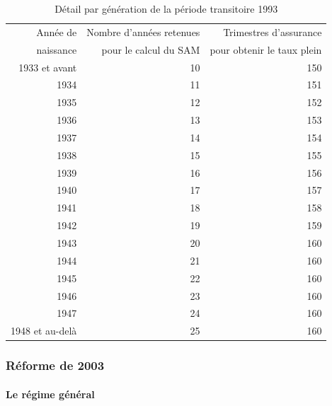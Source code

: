 \begin{table}[h]
  \centering
  \caption{Détail par génération de la période transitoire 1993}
    \begin{tabular}{rrr}
    \toprule
    Année de  & Nombre d'années retenues & Trimestres d'assurance  \\
    naissance & pour le calcul du SAM    & pour obtenir le taux plein \\
    \midrule
    1933 et avant & 10    & 150 \\
    1934  & 11    & 151 \\
    1935  & 12    & 152 \\
    1936  & 13    & 153 \\
    1937  & 14    & 154 \\
    1938  & 15    & 155 \\
    1939  & 16    & 156 \\
    1940  & 17    & 157 \\
    1941  & 18    & 158 \\
    1942  & 19    & 159 \\
    1943  & 20    & 160 \\
    1944  & 21    & 160 \\
    1945  & 22    & 160 \\
    1946  & 23    & 160 \\
    1947  & 24    & 160 \\
    1948 et au-delà & 25    & 160 \\
    \bottomrule
    \end{tabular}%
  \label{tab:addlabel}%
\end{table}%


\subsubsection{Réforme de 2003}

\paragraph{Le régime général}

